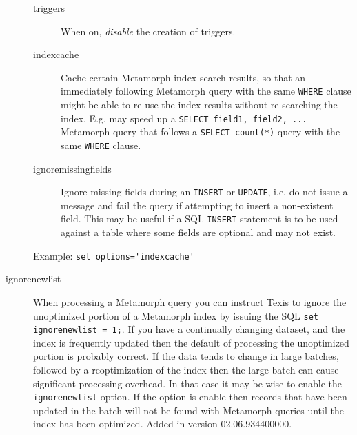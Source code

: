 \begin{description}
  \begin{description}
    \item[triggers] When on, {\em disable} the creation of triggers.
    \item[indexcache] Cache certain Metamorph index search results, so
      that an immediately following Metamorph query with the same
      \verb`WHERE` clause might be able to re-use the index results
      without re-searching the index.  E.g. may speed up a
      \verb`SELECT field1, field2, ...` Metamorph query that follows
      a \verb`SELECT count(*)` query with the same \verb`WHERE` clause.
    \item[ignoremissingfields] Ignore missing fields during an
      \verb`INSERT` or \verb`UPDATE`, i.e. do not issue a message and
      fail the query if attempting to insert a non-existent field.
      This may be useful if a SQL \verb`INSERT` statement is to be
      used against a table where some fields are optional and may not
      exist.
  \end{description}

Example:  \verb`set options='indexcache'`

\item[ignorenewlist] When processing a Metamorph query you can instruct
Texis to ignore the unoptimized portion of a Metamorph index by issuing
the SQL \verb`set ignorenewlist = 1;`.  If you have a continually
changing dataset, and the index is frequently updated then the default
of processing the unoptimized portion is probably correct.  If the data
tends to change in large batches, followed by a reoptimization of the
index then the large batch can cause significant processing overhead.
In that case it may be wise to enable the \verb'ignorenewlist' option.
If the option is enable then records that have been updated in the batch
will not be found with Metamorph queries until the index has been optimized.
Added in version 02.06.934400000.


\end{description}
